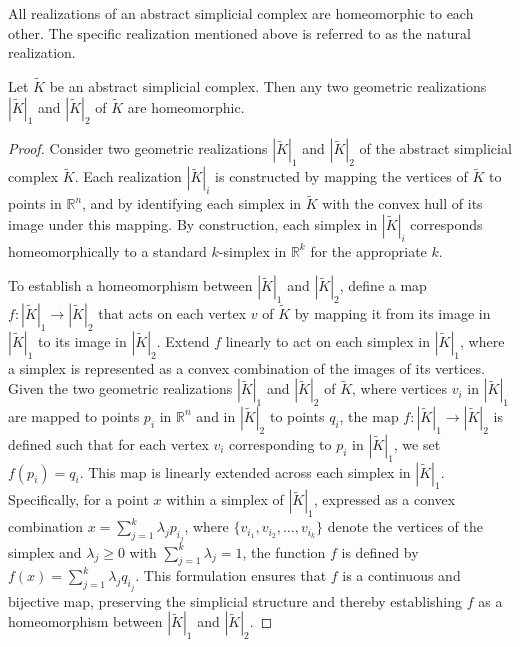 All realizations of an abstract simplicial complex are homeomorphic to each other.
The specific realization mentioned above is referred to as the natural
realization.

\begin{proposition}
	Let $\tilde{K}$ be an abstract simplicial complex. Then any two geometric
	realizations $|\tilde{K}|_{1}$ and $|\tilde{K}|_{2}$ of $\tilde{K}$ are
	homeomorphic.
\end{proposition}

\begin{proof}
	Consider two geometric realizations $|\tilde{K}|_{1}$ and $|\tilde{K}|_{2}$ of
	the abstract simplicial complex $\tilde{K}$. Each realization
	$|\tilde{K}|_{i}$ is constructed by mapping the vertices of $\tilde{K}$ to
	points in $\mathbb{R}^{n}$, and by identifying each simplex in $\tilde{K}$ with
	the convex hull of its image under this mapping. By construction, each simplex
	in $|\tilde{K}|_{i}$ corresponds homeomorphically to a standard $k$-simplex in
	$\mathbb{R}^{k}$ for the appropriate $k$.

	To establish a homeomorphism between $|\tilde{K}|_{1}$ and $|\tilde{K}|_{2}$,
	define a map $f: |\tilde{K}|_{1} \to |\tilde{K}|_{2}$ that acts on each vertex
	$v$ of $\tilde{K}$ by mapping it from its image in $|\tilde{K}|_{1}$ to its
	image in $|\tilde{K}|_{2}$. Extend $f$ linearly to act on each simplex in $|\tilde
	{K}|_{1}$, where a simplex is represented as a convex combination of the
	images of its vertices. Given the two geometric realizations $|\tilde{K}|_{1}$
	and $|\tilde{K}|_{2}$ of $\tilde{K}$, where vertices $v_{i}$ in
	$|\tilde{K}|_{1}$ are mapped to points $p_{i}$ in $\mathbb{R}^{n}$ and in
	$|\tilde{K}|_{2}$ to points $q_{i}$, the map $f : |\tilde{K}|_{1} \to |\tilde{K}
	|_{2}$ is defined such that for each vertex $v_{i}$ corresponding to $p_{i}$ in
	$|\tilde{K}|_{1}$, we set $f(p_{i}) = q_{i}$. This map is linearly extended across
	each simplex in $|\tilde{K}|_{1}$. Specifically, for a point $x$ within a simplex
	of $|\tilde{K}|_{1}$, expressed as a convex combination
	$x = \sum_{j=1}^{k} \lambda_{j} p_{i_j}$, where $\{v_{i_1}, v_{i_2}, \ldots, v_{i_k}
	\}$ denote the vertices of the simplex and $\lambda_{j} \geq 0$ with $\sum_{j=1}
	^{k} \lambda_{j} = 1$, the function $f$ is defined by
	$f(x) = \sum_{j=1}^{k} \lambda_{j} q_{i_j}$. This formulation ensures that $f$
	is a continuous and bijective map, preserving the simplicial structure and
	thereby establishing $f$ as a homeomorphism between $|\tilde{K}|_{1}$ and
	$|\tilde{K}|_{2}$.


\end{proof}

